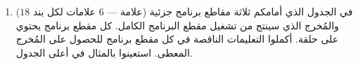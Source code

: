 \documentclass[14pt]{extarticle}
\begin{document}
\begin{enumerate}[label=\textbf{السؤال \arabic*:}, wide=0pt, itemsep=2.2em]
{\begin{longtable}{|C{1.5cm}|p{9cm}|C{4cm}|}
\hline
$4$ &
\begin{pycell}
\begin{english}
\begin{verbatim}
i = 20
while i > 5:
    print(i)
    i = i - 7
\end{verbatim}
\end{english}
\end{pycell}
& \ifwithsols \begin{english}\texttt{20}\newline\texttt{13}\newline\texttt{6}\end{english} \fi \\
\hline
\end{longtable}}
\filbreak

\item ($18$ علامة — $6$ علامات لكل بند) في الجدول الذي أمامكم ثلاثة مقاطع برنامج جزئية والمُخرج الذي سينتج من تشغيل مقطع البرنامج الكامل. كل مقطع برنامج يحتوي على حلقة.
أكملوا التعليمات الناقصة في كل مقطع برنامج للحصول على المُخرج المعطى. استعينوا بالمثال في أعلى الجدول.


\end{enumerate}
\end{document}
